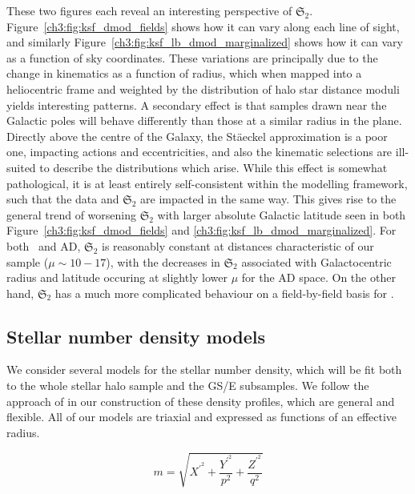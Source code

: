 These two figures each reveal an interesting perspective of $\mathfrak{S}_{2}$. Figure~\ref{ch3:fig:ksf_dmod_fields} shows how it can vary along each line of sight, and similarly Figure~\ref{ch3:fig:ksf_lb_dmod_marginalized} shows how it can vary as a function of sky coordinates. These variations are principally due to the change in kinematics as a function of radius, which when mapped into a heliocentric frame and weighted by the distribution of halo star distance moduli yields interesting patterns. A secondary effect is that samples drawn near the Galactic poles will behave differently than those at a similar radius in the plane. Directly above the centre of the Galaxy, the St\"{a}eckel approximation is a poor one, impacting actions and eccentricities, and also the kinematic selections are ill-suited to describe the distributions which arise. While this effect is somewhat pathological, it is at least entirely self-consistent within the modelling framework, such that the data and $\mathfrak{S}_{2}$ are impacted in the same way. This gives rise to the general trend of worsening $\mathfrak{S}_{2}$ with larger absolute Galactic latitude seen in both Figure~\ref{ch3:fig:ksf_dmod_fields} and \ref{ch3:fig:ksf_lb_dmod_marginalized}. For both \eLz\ and AD, $\mathfrak{S}_{2}$ is reasonably constant at distances characteristic of our sample ($\mu \sim 10-17$), with the decreases in $\mathfrak{S}_{2}$ associated with Galactocentric radius and latitude occuring at slightly lower $\mu$ for the AD space. On the other hand, $\mathfrak{S}_{2}$ has a much more complicated behaviour on a field-by-field basis for \JRLz. 

\subsection{Stellar number density models}
\label{ch3:subsec:density-models}

We consider several models for the stellar number density, which will be fit both to the whole stellar halo sample and the GS/E subsamples. We follow the approach of \cite{mackereth20} in our construction of these density profiles, which are general and flexible. All of our models are triaxial and expressed as functions of an effective radius.

\begin{equation}
\label{ch3:eq:effective-radius}
m = \sqrt{ X^{\prime^{2}} + \frac{Y^{\prime^{2}}}{p^{2}} + \frac{Z^{\prime^{2}}}{q^{2}} }
\end{equation}

